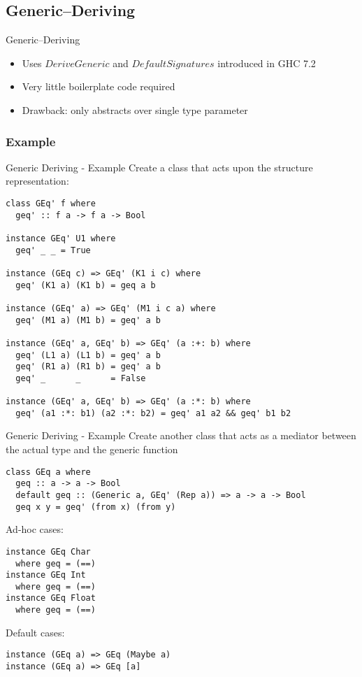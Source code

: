 \documentclass[10pt]{beamer}
\begin{document}
\subsection{Generic--Deriving}
\begin{frame}{Generic--Deriving}

\begin{itemize}
	\item Uses $ DeriveGeneric $ and $ DefaultSignatures $ introduced in GHC 7.2
	\item Very little boilerplate code required
	\item Drawback: only abstracts over single type parameter
\end{itemize}

\end{frame}

\subsubsection*{Example}
\begin{frame}[fragile]{Generic Deriving - Example}
Create a class that acts upon the structure representation:
\begin{lstlisting}
class GEq' f where
  geq' :: f a -> f a -> Bool

instance GEq' U1 where
  geq' _ _ = True

instance (GEq c) => GEq' (K1 i c) where
  geq' (K1 a) (K1 b) = geq a b

instance (GEq' a) => GEq' (M1 i c a) where
  geq' (M1 a) (M1 b) = geq' a b

instance (GEq' a, GEq' b) => GEq' (a :+: b) where
  geq' (L1 a) (L1 b) = geq' a b
  geq' (R1 a) (R1 b) = geq' a b
  geq' _      _      = False

instance (GEq' a, GEq' b) => GEq' (a :*: b) where
  geq' (a1 :*: b1) (a2 :*: b2) = geq' a1 a2 && geq' b1 b2
\end{lstlisting}

\end{frame}

\begin{frame}[fragile]{Generic Deriving - Example}
Create another class that acts as a mediator between the actual type and the generic function
\begin{lstlisting}
class GEq a where 
  geq :: a -> a -> Bool
  default geq :: (Generic a, GEq' (Rep a)) => a -> a -> Bool
  geq x y = geq' (from x) (from y)
\end{lstlisting}

Ad-hoc cases:
\begin{lstlisting}
instance GEq Char   
  where geq = (==)
instance GEq Int    
  where geq = (==)
instance GEq Float  
  where geq = (==)
\end{lstlisting}

Default cases:
\begin{lstlisting}
instance (GEq a) => GEq (Maybe a)
instance (GEq a) => GEq [a]
\end{lstlisting}

\end{frame}
\end{document}
